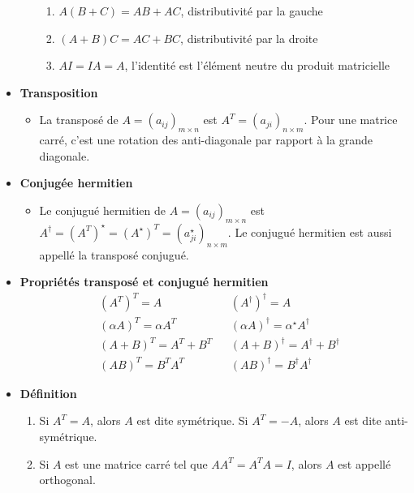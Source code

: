 \begin{itemize}
\begin{itemize}
\begin{enumerate}
                        \item $A(B + C) = AB + AC$, distributivité par la gauche
                        \item $(A + B)C = AC + BC$, distributivité par la droite
                        \item $AI = IA = A$, l'identité est l'élément neutre du produit matricielle
                    \end{enumerate}
          \end{itemize}
    \item[] \textbf{Transposition} \begin{itemize}
              \item[] La transposé de $A = (a_{ij})_{m \times n}$ est $A^{T} = (a_{ji})_{n \times m}$.
                    Pour une matrice carré, c'est une rotation des anti-diagonale par rapport à la grande diagonale.
          \end{itemize}
    \item[] \textbf{Conjugée hermitien} \begin{itemize}
              \item[] Le conjugué hermitien de $A = (a_{ij})_{m \times n}$ est $A^{\dagger} = \left(A^T\right)^\star = \left(A^\star\right)^T = (a_{ji}^\star)_{n \times m}$.
                    Le conjugué hermitien est aussi appellé la transposé conjugué.
          \end{itemize}
    \item[] \textbf{Propriétés transposé et conjugué hermitien} \begin{align*}
               & \left( A^T \right)^T = A               &  & \left( A^\dagger \right)^\dagger = A                     \\
               & \left( \alpha A \right)^T = \alpha A^T &  & \left( \alpha A \right)^\dagger = \alpha^\star A^\dagger \\
               & \left( A + B \right)^T = A^T + B^T     &  & \left( A + B \right)^\dagger = A^\dagger + B^\dagger     \\
               & \left( AB \right)^T = B^TA^T           &  & \left( AB \right)^\dagger = B^\dagger A^\dagger
          \end{align*}
    \item[] \textbf{Définition} \begin{enumerate}
              \item Si $A^T = A$, alors $A$ est dite symétrique. Si $A^T = -A$, alors $A$ est dite anti-symétrique.
              \item Si $A$ est une matrice carré tel que $AA^T = A^TA = I$, alors $A$ est appellé orthogonal.

\end{enumerate}
\end{itemize}
